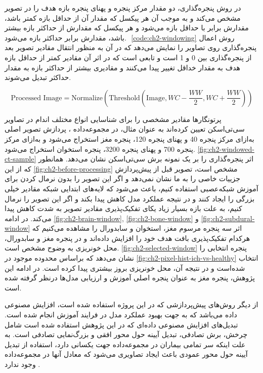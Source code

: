 در روش پنجره‌گذاری، دو مقدار مرکز پنجره
و پهنای پنجره
بازه هدف را در تصویر مشخص می‌کند و به موجب آن هر پیکسل که مقدار آن از حداقل بازه کمتر باشد، مقدارش برابر با حداقل بازه می‌شود و هر پیکسل که مقدارش از حداکثر بازه بیشتر باشد، مقدارش برابر حداکثر بازه می‌شود. ‎
\autoref{code:ch2-windowing}
روش اعمال پنجره‌گذاری روی تصاویر را نمایش می‌دهد که در آن 
به منظور انتقال مقادیر تصویر بعد از پنجره‌گذاری بین 0 و 1 است و 
تابعی است که در اثر آن مقادیر کمتر از حداقل بازه هدف به مقدار خداقل تغییر پیدا می‌کنند و مقادیری بیشتر از حداکثر بازه به مقدار حداکثر تبدیل می‌شوند.   
\begin{latin}
\begin{equation}
\text{Processed Image} = \text{Normalize}(\text{Threshold}(\text{Image}, WC-\frac{WW}{2},WC+\frac{WW}{2})) 
\end{equation}
\label{code:ch2-windowing}
\end{latin}

پرتونگار‌ها مقادیر مشخصی را برای شناسایی انواع مختلف اندام در تصاویر سی‌تی‌اسکن تعیین کرده‌اند به عنوان مثال، در مجموعه‌داده
،
پردازش تصویر اصلی به‌ازای مرکز پنجره 40 و پهنای پنجره 120، پنجره مغز استخراج می‌شود و به‌ازای مرکز پنجره 700 و پهنای پنجره 3200،‌ پنجره استخوان استخراج می‌شود.
\autoref{fig:ch2-windowed-ct-sample}
اثر پنجره‌گذاری را بر یک نمونه برش سی‌تی‌اسکن نشان می‌دهد. همانطور که از این
\autoref{fig:ch2-before-processing}
 مشخص است، تصویر قبل از پیش‌پردازش جزییات خاصی را به ما نشان نمی‌دهد و اگر این تصویر را بدون نرمال کردن برای آموزش شبکه‌عصبی استفاده کنیم، باعث می‌شود که لایه‌های ابتدایی شبکه مقادیر خیلی بزرگی را ایجاد کنند و در نتیجه عملکرد مدل کاهش پیدا بکند و اگر این تصویر را نرمال کنیم، به علت بازه بسیار زیاد یکای 
تفکیک‌پذیری مقادیر تصویر به شدت کاهش پیدا می‌کند. در ادامه
\autoref{fig:ch2-brain-window}, \autoref{fig:ch2-bone-window} و \autoref{fig:ch2-subdural-window}
اثر سه پنجره مرسوم مغز، استخوان و سابدورال را مشاهده می‌کنیم که هرکدام تفکیک‌پذیری بافت هدف خود را افزایش داده‌اند و در پنجره مغز و سابدورال، محل خونریزی به وضوح مشخص است.
\autoref{fig:ch2-selected-window}
 پنجره انتخابی را نشان می‌دهد که براساس محدوده موجود در  
\autoref{fig:ch2-pixel-hist-ich-vs-healthy}
انتخاب شده‌است و در نتیجه آن، محل خونریزی بروز بیشتری پیدا کرده است. در ادامه این پژوهش،‌ پنجره مغز به عنوان پنجره اصلی آموزش و ارزیابی مدل‌ها درنظر گرفته شده است.

از دیگر روش‌های پیش‌پردازشی که در این پروژه استفاده شده است، افزایش مصنوعی داده می‌باشد که به جهت بهبود عملکرد مدل در فرایند آموزش انجام شده است. تبدیل‌های افزایش مصنوعی داده‌ای که در این پژوهش استفاده شده است شامل چرخش، برش تصادفی،‌ تبدیل آیینه حول محور افقی و‌ بزرگ‌نمایی تصادفی است. به علت اینکه سر تمامی بیماران در مجموعه‌داده 
جهت یکسانی دارد، استفاده از تبدیل آیینه حول محور عمودی باعث ایجاد تصاویری می‌شود که معادل آنها در مجموعه‌داده وجود ندارد
\cite{hssayeni2020intracranial}.



